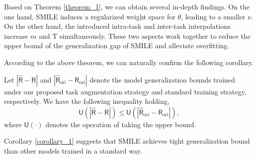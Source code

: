 Based on Theorem \ref{theorem_1}, we can obtain several in-depth findings. On the one hand, SMILE induces a regularized weight space for $\theta$, leading to a smaller $\nu$. On the other hand, the introduced intra-task and inter-task interpolations increase $m$ and $\mathrm{T}$ simultaneously. These two aspects work together to reduce the upper bound of the generalization gap of SMILE and alleviate overfitting.

According to the above theorem, we can naturally confirm the following corollary.

\begin{corollary}
\label{corollary_1}
    Let $|\hat{\mathsf R}\!-\!\mathsf R|$ and $|\hat{\mathsf R}_\mathrm{ori}\!-\!\mathsf R_\mathrm{ori}|$ denote the model generalization bounds trained under our proposed task augmentation strategy and standard training strategy, respectively. %
    We have the following inequality holding,
    \begin{equation}
    \mathsf U (|\hat{\mathsf R}\!-\!\mathsf R|) \leq \mathsf U (|\hat{\mathsf R}_{\mathrm{ori}}\!-\!\mathsf R_{\mathrm{ori}}|),
    \end{equation}
    where $\mathsf U(\cdot)$ denotes the operation of taking the upper bound.
\end{corollary}

Corollary \ref{corollary_1} suggests that SMILE achieves tight generalization bound than other models trained in a standard way. %

